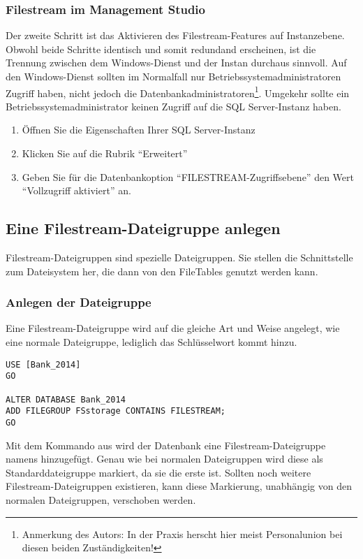         \subsubsection{Filestream im Management Studio}
          Der zweite Schritt ist das Aktivieren des Filestream-Features auf
          Instanzebene. Obwohl beide Schritte identisch und somit redundand
          erscheinen, ist die Trennung zwischen dem Windows-Dienst und der
          Instan durchaus sinnvoll. Auf den Windows-Dienst sollten im
          Normalfall nur Betriebssystemadministratoren Zugriff haben, nicht
          jedoch die Datenbankadministratoren\footnote{Anmerkung des Autors: In
          der Praxis herscht hier meist Personalunion bei diesen beiden
          Zuständigkeiten!}. Umgekehr sollte ein Betriebssystemadministrator
          keinen Zugriff auf die SQL Server-Instanz haben. 
          \begin{enumerate}
            \item Öffnen Sie die Eigenschaften Ihrer SQL Server-Instanz
            \item Klicken Sie auf die Rubrik \enquote{Erweitert}
            \item Geben Sie für die Datenbankoption
            \enquote{FILESTREAM-Zugriffsebene} den Wert \enquote{Vollzugriff
            aktiviert} an.
          \end{enumerate}
          \begin{literaturinternet}
            \item \cite{llobelwp20101212ss2fp2o4}
          \end{literaturinternet}
      \subsection{Eine Filestream-Dateigruppe anlegen}
        Filestream-Dateigruppen sind spezielle Dateigruppen. Sie stellen die
        Schnittstelle zum Dateisystem her, die dann von den FileTables genutzt
        werden kann.
        \subsubsection{Anlegen der Dateigruppe}
          Eine Filestream-Dateigruppe wird auf die gleiche Art und Weise
          angelegt, wie eine normale Dateigruppe, lediglich das Schlüsselwort
           kommt hinzu.
          \begin{lstlisting}[language=ms_sql, caption={Eine
          Filestream-Dateigruppe anlegen}, label=admin04_01]
USE [Bank_2014]
GO

ALTER DATABASE Bank_2014
ADD FILEGROUP FSstorage CONTAINS FILESTREAM;
GO
          \end{lstlisting}
          Mit dem Kommando aus  wird der Datenbank
           eine Filestream-Dateigruppe namens
           hinzugefügt. Genau wie bei normalen
          Dateigruppen wird diese als Standarddateigruppe markiert, da sie die
          erste ist. Sollten noch weitere Filestream-Dateigruppen existieren,
          kann diese Markierung, unabhängig von den normalen  Dateigruppen,
          verschoben werden.
